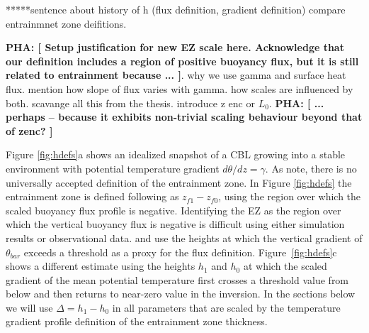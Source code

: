 \documentclass[referee]{svjour3}
\newcommand{\remarkpha}[1]{{ \bf PHA:  [ \footnotesize #1 ]}}
\begin{document}
*****sentence about history of h (flux definition, gradient definition) compare entrainmnet zone deifitions.  


\remarkpha{Setup justification for new EZ scale here.   Acknowledge that our definition includes a region of positive buoyancy flux, but it is still related to entrainment because ...}.  why we use gamma and surface heat flux. mention how slope of flux varies with gamma.  how scales are influenced by both. scavange all this from the thesis.  introduce z enc or $L_0$. \remarkpha{... perhaps -- because it exhibits non-trivial scaling behaviour beyond that of zenc?}

Figure \ref{fig:hdefs}a shows an idealized  snapshot of a CBL growing into a stable environment with potential temperature gradient $d\theta/dz = \gamma$.  As \citet{Brooks12} note, there is no universally accepted definition of the entrainment zone. In Figure \ref{fig:hdefs} the entrainment zone is defined following as $z_{f1} - z_{f0}$, using the region over which the scaled buoyancy flux profile is negative.  Identifying the EZ as the region over which the vertical buoyancy flux is negative is difficult using either simulation results or observational data.  \citet{Cohn00} and \citet{Fedorovich04} use the heights at which the vertical gradient of $\theta_{bar}$ exceeds a threshold as a proxy for the flux definition.  Figure~\ref{fig:hdefs}c shows a different estimate using the heights $h_1$ and $h_0$ at which the scaled gradient of the mean potential temperature first crosses a threshold value from below and then returns to near-zero value in the inversion.  In the sections below we will use $\Delta = h_1 - h_0$ in all parameters that are scaled by the temperature gradient profile definition of the entrainment zone thickness.
\end{document}
